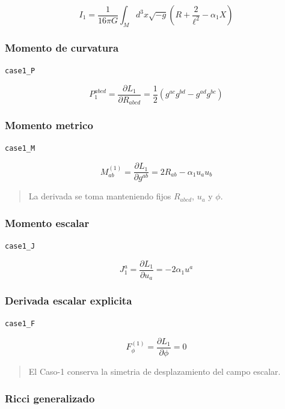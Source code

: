 \documentclass[11pt,a4paper]{article}
\begin{document}
\[
I_1 = \frac{1}{16\pi G}\int_Md^3x\sqrt{-g}\left(R+\frac{2}{\ell^2}-\alpha_1X\right)
\]

\subsubsection{Momento de curvatura}

\noindent\texttt{case1\_P}\par\nopagebreak[4]

\[
P_1^{abcd}=\frac{\partial L_1}{\partial R_{abcd}} = \frac12\left(g^{ac}g^{bd}-g^{ad}g^{bc}\right)
\]

\subsubsection{Momento metrico}

\noindent\texttt{case1\_M}\par\nopagebreak[4]

\[
M^{(1)}_{ab}=\frac{\partial L_1}{\partial g^{ab}} = 2R_{ab}-\alpha_1u_au_b
\]

\begin{quote}\small La derivada se toma manteniendo fijos \(R_{abcd}\), \(u_a\) y \(\phi\).\end{quote}

\subsubsection{Momento escalar}

\noindent\texttt{case1\_J}\par\nopagebreak[4]

\[
J_1^a=\frac{\partial L_1}{\partial u_a} = -2\alpha_1u^a
\]

\subsubsection{Derivada escalar explicita}

\noindent\texttt{case1\_F}\par\nopagebreak[4]

\[
F_\phi^{(1)}=\frac{\partial L_1}{\partial\phi} = 0
\]

\begin{quote}\small El Caso-1 conserva la simetria de desplazamiento del campo escalar.\end{quote}

\subsubsection{Ricci generalizado}
\end{document}
